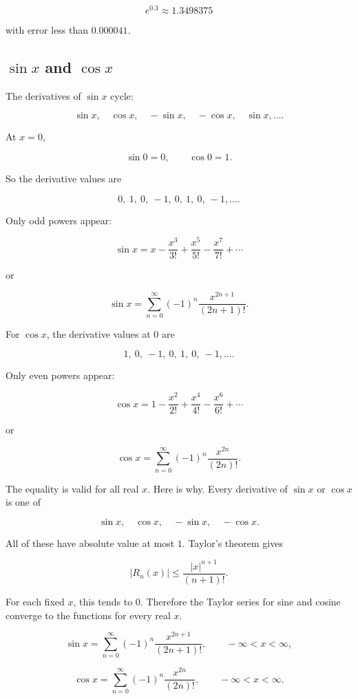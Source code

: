 \[
\boxed{
e^{0.3}\approx1.3498375
}
\]

with error less than \(0.000041\).

\subsection{\texorpdfstring{\(\sin x\) and \(\cos x\)}{sin x and cos x}}
\label{subsec:taylor-series-sin-cos}

The derivatives of \(\sin x\) cycle:

\[
\sin x,\quad \cos x,\quad -\sin x,\quad -\cos x,\quad \sin x,\ldots.
\]

At \(x=0\),

\[
\sin0=0,
\qquad
\cos0=1.
\]

So the derivative values are

\[
0,\ 1,\ 0,\ -1,\ 0,\ 1,\ 0,\ -1,\ldots.
\]

Only odd powers appear:

\[
\boxed{
\sin x
=
x-\frac{x^3}{3!}+\frac{x^5}{5!}-\frac{x^7}{7!}+\cdots
}
\]

or

\[
\boxed{
\sin x=
\sum_{n=0}^{\infty}
(-1)^n\frac{x^{2n+1}}{(2n+1)!}.
}
\]

For \(\cos x\), the derivative values at \(0\) are

\[
1,\ 0,\ -1,\ 0,\ 1,\ 0,\ -1,\ldots.
\]

Only even powers appear:

\[
\boxed{
\cos x
=
1-\frac{x^2}{2!}+\frac{x^4}{4!}-\frac{x^6}{6!}+\cdots
}
\]

or

\[
\boxed{
\cos x=
\sum_{n=0}^{\infty}
(-1)^n\frac{x^{2n}}{(2n)!}.
}
\]

The equality is valid for all real \(x\).  Here is why.  Every derivative of \(\sin x\) or
\(\cos x\) is one of

\[
\sin x,\quad \cos x,\quad -\sin x,\quad -\cos x.
\]

All of these have absolute value at most \(1\).  Taylor's theorem gives

\[
|R_n(x)|\le \frac{|x|^{n+1}}{(n+1)!}.
\]

For each fixed \(x\), this tends to \(0\).  Therefore the Taylor series for sine and cosine
converge to the functions for every real \(x\).

\[
\boxed{
\sin x=\sum_{n=0}^{\infty}
(-1)^n\frac{x^{2n+1}}{(2n+1)!},
\qquad -\infty<x<\infty,
}
\]

\[
\boxed{
\cos x=\sum_{n=0}^{\infty}
(-1)^n\frac{x^{2n}}{(2n)!},
\qquad -\infty<x<\infty.
}
\]

